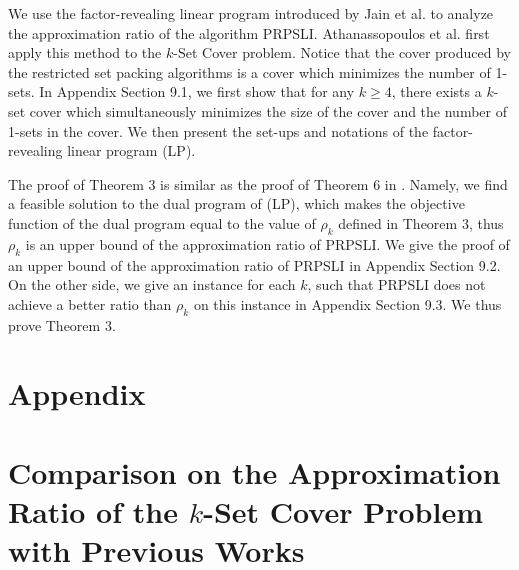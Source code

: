 \documentclass[runningheads,a4paper]{llncs}
\numberwithin{equation}{section}
\begin{document}
We use the factor-revealing linear program introduced by Jain et al. \cite{lp1} to analyze the approximation ratio of the algorithm PRPSLI. Athanassopoulos et al. \cite{lp} first apply this method to the $k$-Set Cover problem. Notice that the cover produced by the restricted set packing algorithms is a cover which minimizes the number of 1-sets. In Appendix Section 9.1, we first show that for any $k\geq 4$, there exists a $k$-set cover which simultaneously minimizes the size of the cover and the number of 1-sets in the cover. We then present the set-ups and notations of the factor-revealing linear program (LP).

The proof of Theorem 3 is similar as the proof of Theorem 6 in \cite{lp}. Namely, we find a feasible solution to the dual program of (LP), which makes the objective function of the dual program equal to the value of $\rho_k$ defined in Theorem 3, thus $\rho_k$ is an upper bound of the approximation ratio of PRPSLI. We give the proof of an upper bound of the approximation ratio of PRPSLI in Appendix Section 9.2. On the other side, we give an instance for each $k$, such that PRPSLI does not achieve a better ratio than $\rho_k$ on this instance in Appendix Section 9.3. We thus prove Theorem 3.\\







\newpage



\section*{Appendix}

\section{Comparison on the Approximation Ratio of the $k$-Set Cover Problem with Previous Works}
\end{document}
